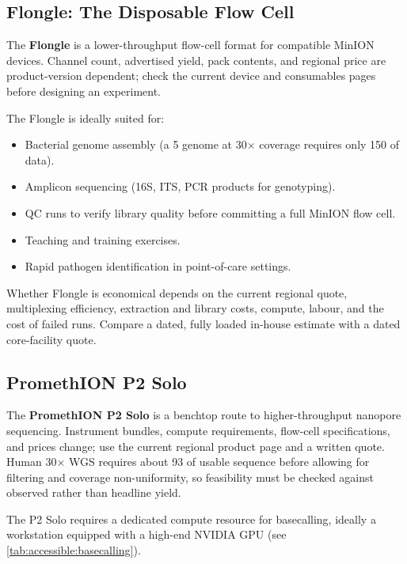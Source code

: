 \subsection{Flongle: The Disposable Flow Cell}
\label{subsec:accessible:flongle}

The \textbf{Flongle} is a lower-throughput flow-cell format for compatible MinION devices. Channel count, advertised yield, pack contents, and regional price are product-version dependent; check the current device and consumables pages before designing an experiment.

The Flongle is ideally suited for:

\begin{itemize}[itemsep=2pt]
  \item Bacterial genome assembly (a 5\megabase{} genome at 30$\times$ coverage requires only 150\megabase{} of data).
  \item Amplicon sequencing (16S, ITS, \acrshort{PCR} products for genotyping).
  \item \acrshort{QC} runs to verify library quality before committing a full MinION flow cell.
  \item Teaching and training exercises.
  \item Rapid pathogen identification in point-of-care settings.
\end{itemize}

Whether Flongle is economical depends on the current regional quote, multiplexing efficiency, extraction and library costs, compute, labour, and the cost of failed runs. Compare a dated, fully loaded in-house estimate with a dated core-facility quote.

\subsection{PromethION P2 Solo}
\label{subsec:accessible:p2solo}

The \textbf{PromethION P2 Solo} is a benchtop route to higher-throughput nanopore sequencing. Instrument bundles, compute requirements, flow-cell specifications, and prices change; use the current regional product page and a written quote. Human 30$\times$ WGS requires about 93\gigabase{} of usable sequence before allowing for filtering and coverage non-uniformity, so feasibility must be checked against observed rather than headline yield.

The P2 Solo requires a dedicated compute resource for basecalling, ideally a workstation equipped with a high-end NVIDIA GPU (see \cref{tab:accessible:basecalling}).

